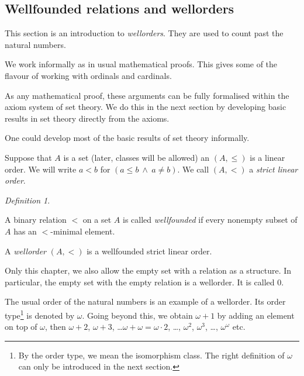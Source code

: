 \documentclass[a4paper, 11pt]{amsart}
\theoremstyle{remark}
\newtheorem{definition}[definition]{Definition}
\newenvironment{enumerate-(1)}{\begin{enumerate}[label={\upshape (\arabic*)}, leftmargin=2pc]}{\end{enumerate}}
\begin{document}
\subsection{Wellfounded relations and wellorders} 


This section is an introduction to \emph{wellorders}. 
They are used to count past the natural numbers. 

We work informally as in usual mathematical proofs. 
This gives some of the flavour of working with ordinals and cardinals. 

As any mathematical proof, these arguments can be fully formalised within the axiom system of set theory. 
We do this in the next section by developing basic results in set theory directly from the axioms. 

One could develop most of the basic results of set theory informally. 



Suppose that $A$ is a set (later, classes will be allowed) an $(A,\leq)$ is a linear order. We will write $a<b$ for $(a\leq b\ \wedge\ a\neq b)$. 
We call $(A,<)$ a \emph{strict linear order}.  


\begin{definition} \ 
\begin{enumerate-(1)} 
\item 
A binary relation $<$ on a set $A$ is called \emph{wellfounded} if every nonempty subset of $A$ has an $<$-minimal element. 
\item 
A \emph{wellorder} $(A,<)$ is a wellfounded strict linear order. 
\end{enumerate-(1)} 
\end{definition} 

Only this chapter, we also allow the empty set with a relation as a structure. 
In particular, the empty set with the empty relation is a wellorder. It is called $0$. 

The usual order of the natural numbers is an example of a wellorder. 
Its order type\footnote{By the order type, we mean the isomorphism class. 
The right definition of $\omega$ can only be introduced in the next section.} 
is denoted by $\omega$. 
Going beyond this, we obtain $\omega+1$ by adding an element on top of $\omega$, then $\omega+2$, $\omega+3$, \dots $\omega+\omega=\omega\cdot 2$, \dots, $\omega^2$, $\omega^3$, \dots, $\omega^\omega$ etc. 
\end{document}
